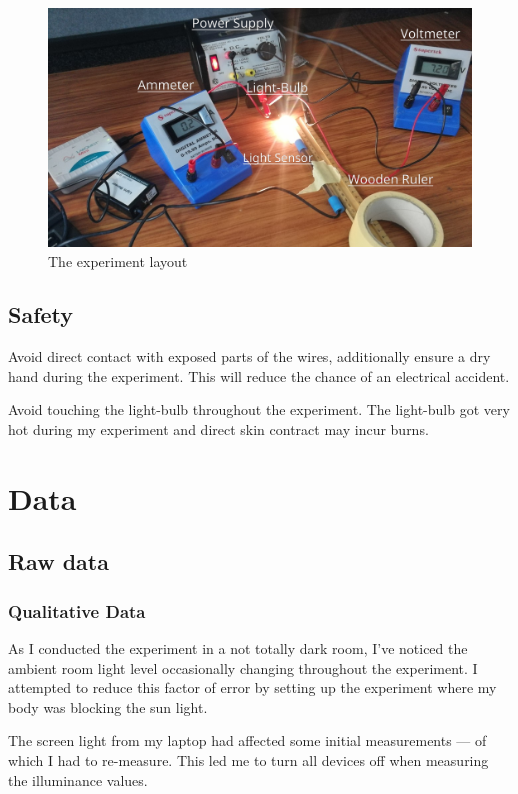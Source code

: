 \documentclass[a4paper,12pt]{article}
\begin{document}
\begin{figure}[H]
 \centering
 \includegraphics[width=\textwidth]{assets/setuppic.png}
 \caption{The experiment layout}
 \label{fig:layout}
\end{figure}


\subsection{Safety}
Avoid direct contact with exposed parts of the wires, additionally ensure a dry hand during the experiment. This will reduce the chance of an electrical accident.

Avoid touching the light-bulb throughout the experiment. The light-bulb got very hot during my experiment and direct skin contract may incur burns.

\section{Data}
\subsection{Raw data}
\subsubsection*{Qualitative Data}
As I conducted the experiment in a not totally dark room, I've noticed the ambient room light level occasionally changing throughout the experiment. I attempted to reduce this factor of error by setting up the experiment where my body was blocking the sun light.

The screen light from my laptop had affected some initial measurements --- of which I had to re-measure. This led me to turn all devices off when measuring the illuminance values.
\end{document}
